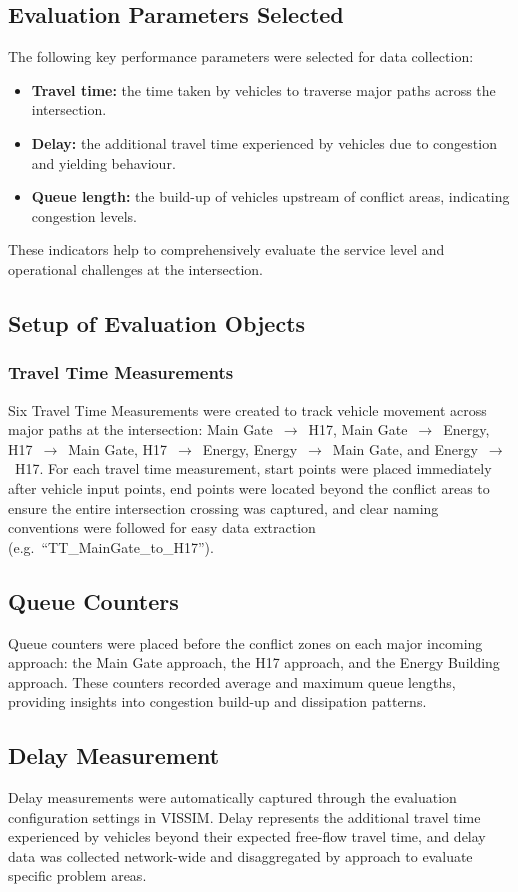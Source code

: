 \documentclass[11pt]{article}
\begin{document}
\subsection{Evaluation Parameters Selected}
The following key performance parameters were selected for data collection:
\begin{itemize}
  \item \textbf{Travel time:} the time taken by vehicles to traverse major paths across the
  intersection.
  \item \textbf{Delay:} the additional travel time experienced by vehicles due to congestion and
  yielding behaviour.
  \item \textbf{Queue length:} the build-up of vehicles upstream of conflict areas, indicating
  congestion levels.
\end{itemize}
These indicators help to comprehensively evaluate the service level and operational challenges at the
intersection.

\subsection{Setup of Evaluation Objects}

\subsubsection{Travel Time Measurements}
Six Travel Time Measurements were created to track vehicle movement across major paths at the
intersection: Main Gate~$\to$~H17, Main Gate~$\to$~Energy, H17~$\to$~Main Gate, H17~$\to$~Energy,
Energy~$\to$~Main Gate, and Energy~$\to$~H17. For each travel time measurement, start points were placed
immediately after vehicle input points, end points were located beyond the conflict areas to ensure the
entire intersection crossing was captured, and clear naming conventions were followed for easy data
extraction (e.g.\ ``TT\_MainGate\_to\_H17'').

\subsection{Queue Counters}
Queue counters were placed before the conflict zones on each major incoming approach: the Main Gate
approach, the H17 approach, and the Energy Building approach. These counters recorded average and
maximum queue lengths, providing insights into congestion build-up and dissipation patterns.

\subsection{Delay Measurement}
Delay measurements were automatically captured through the evaluation configuration settings in VISSIM.
Delay represents the additional travel time experienced by vehicles beyond their expected free-flow
travel time, and delay data was collected network-wide and disaggregated by approach to evaluate
specific problem areas.
\end{document}
